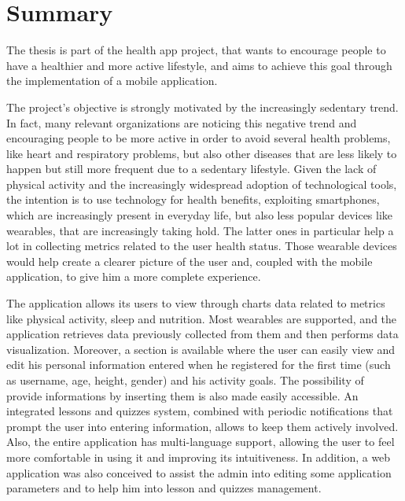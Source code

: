 \section{Summary}

The thesis is part of the health app project, that wants to encourage people to have a healthier and more active lifestyle, and aims to achieve this goal through the implementation of a mobile application.
\vspace{2ex}

\noindent The project's objective is strongly motivated by the increasingly sedentary trend. In fact, many relevant organizations are noticing this negative trend and encouraging people to be more active in order to avoid several health problems, like heart and respiratory problems, but also other diseases that are less likely to happen but still more frequent due to a sedentary lifestyle. Given the lack of physical activity and the increasingly widespread adoption of technological tools, the intention is to use technology for health benefits, exploiting smartphones, which are increasingly present in everyday life, but also less popular devices like wearables, that are increasingly taking hold. The latter ones in particular help a lot in collecting metrics related to the user health status. Those wearable devices would help create a clearer picture of the user and, coupled with the mobile application, to give him a more complete experience. 
\vspace{2ex}

\noindent The application allows its users to view through charts data related to metrics like physical activity, sleep and nutrition. Most wearables are supported, and the application retrieves data previously collected from them and then performs data visualization. Moreover, a section is available where the user can easily view and edit his personal information entered when he registered for the first time (such as username, age, height, gender) and his activity goals. The possibility of provide informations by inserting them is also made easily accessible. An integrated lessons and quizzes system, combined with periodic notifications that prompt the user into entering information, allows to keep them actively involved. Also, the entire application has multi-language support, allowing the user to feel more comfortable in using it and improving its intuitiveness. In addition, a web application was also conceived to assist the admin into editing some application parameters and to help him into lesson and quizzes management. 
\newpage

